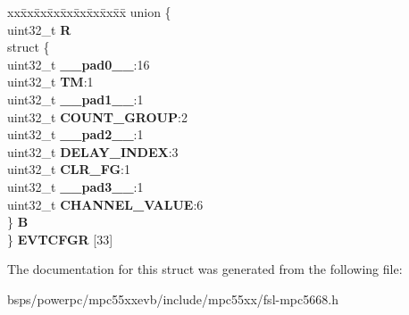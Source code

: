 \begin{DoxyCompactItemize}
\begin{tabbing}
\end{tabbing}\item 
\mbox{\label{structCTU__tag_a0da64f02a6040317325f52a10545475a}} 
\begin{tabbing}
xx\=xx\=xx\=xx\=xx\=xx\=xx\=xx\=xx\=\kill
union \{\\
\>uint32\_t {\bfseries R}\\
\>struct \{\\
\>\>uint32\_t {\bfseries \_\_pad0\_\_}:16\\
\>\>uint32\_t {\bfseries TM}:1\\
\>\>uint32\_t {\bfseries \_\_pad1\_\_}:1\\
\>\>uint32\_t {\bfseries COUNT\_GROUP}:2\\
\>\>uint32\_t {\bfseries \_\_pad2\_\_}:1\\
\>\>uint32\_t {\bfseries DELAY\_INDEX}:3\\
\>\>uint32\_t {\bfseries CLR\_FG}:1\\
\>\>uint32\_t {\bfseries \_\_pad3\_\_}:1\\
\>\>uint32\_t {\bfseries CHANNEL\_VALUE}:6\\
\>\} {\bfseries B}\\
\} {\bfseries EVTCFGR} \mbox{[}33\mbox{]}\\

\end{tabbing}\end{DoxyCompactItemize}


The documentation for this struct was generated from the following file\+:\begin{DoxyCompactItemize}
\item 
bsps/powerpc/mpc55xxevb/include/mpc55xx/fsl-\/mpc5668.\+h\end{DoxyCompactItemize}
